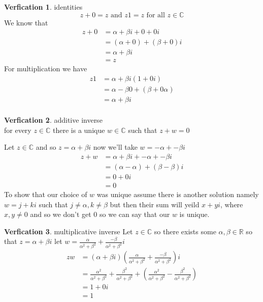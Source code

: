 \documentclass[11pt]{article}
\theoremstyle{definition}
\newtheorem{ver}{Verfication}[section]
\begin{document}
\begin{ver}
    identities
    \begin{equation*}
        z + 0 = z \text{ and } z1 = z \text{ for all } z \in \mathbb{C}
    \end{equation*}
    We know that 
    \begin{align*}
        z + 0 &= \alpha + \beta i + 0 + 0 i\\
              &= \left( \alpha + 0 \right) + \left( \beta + 0 \right) i \\
              &= \alpha + \beta i\\
              &= z  
    \end{align*}
    For multiplication we have
    \begin{align*}
        z1 &=\alpha + \beta i\left( 1 + 0i \right)\\
           &= \alpha - \beta 0 + \left( \beta + 0\alpha  \right)\\
           &= \alpha + \beta i\\
    \end{align*}
\end{ver}

\begin{ver}
    additive inverse\\
    for every $z \in \mathbb{C}$ there is a unique $w \in \mathbb{C}$ such that $z + w = 0$ 

    Let $z \in \mathbb{C}$ and so $z = \alpha + \beta i$ now we'll take $w = -\alpha  + -\beta  i$ 
    \begin{align*}
        z + w &= \alpha + \beta i + -\alpha  + -\beta  i\\
              &= \left( \alpha -\alpha  \right) + \left( \beta - \beta  \right)i\\
              &=0 + 0 i\\
              &=0
    \end{align*}
    To show that our choice of $w$ was unique assume there is another solution namely $w = j + k i$ such that $j \neq \alpha , k \neq \beta $ but then their sum will yeild $x + y i$,  where $x,y \neq 0$ and so we don't get $0$ so we can say that our $w$ is unique.
\end{ver}

\begin{ver}
    multiplicative inverse
    Let $z \in \mathbb{C}$ so there exists some $\alpha, \beta \in \mathbb{R}$ so that $z = \alpha + \beta i$   let $w = \frac{\alpha}{\alpha^2 + \beta^2} + \frac{-\beta}{\alpha^2 + \beta^2} i$ 
    \begin{align*}
        zw &= \left( \alpha + \beta i \right)\left( \frac{\alpha}{\alpha^2 + \beta^2} + \frac{-\beta}{\alpha^2 + \beta^2} \right)i\\
           &= \frac{\alpha^2}{\alpha^2 + \beta^2} + \frac{\beta^2}{\alpha^2 + \beta^2} + \left( \frac{\alpha^2}{\alpha^2 + \beta^2} - \frac{\beta^2}{\alpha^2 + \beta^2} \right)\\
           &= 1 + 0i\\
           &=1
    \end{align*}
\end{ver}
\end{document}
